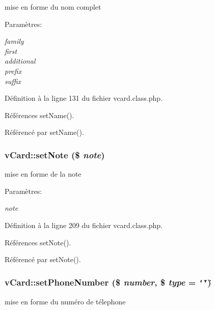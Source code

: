 mise en forme du nom complet 

\begin{Desc}
\item[Param\`{e}tres:]
\begin{description}
\item[{\em family}]\item[{\em first}]\item[{\em additional}]\item[{\em prefix}]\item[{\em suffix}]\end{description}
\end{Desc}


D\'{e}finition \`{a} la ligne 131 du fichier vcard.class.php.

R\'{e}f\'{e}rences set\-Name().

R\'{e}f\'{e}renc\'{e} par set\-Name().\hypertarget{classvCard_a8}{
\subsubsection[setNote]{\setlength{\rightskip}{0pt plus 5cm}v\-Card::set\-Note (\$ {\em note})}}
\label{classvCard_a8}


mise en forme de la note 

\begin{Desc}
\item[Param\`{e}tres:]
\begin{description}
\item[{\em note}]\end{description}
\end{Desc}


D\'{e}finition \`{a} la ligne 209 du fichier vcard.class.php.

R\'{e}f\'{e}rences set\-Note().

R\'{e}f\'{e}renc\'{e} par set\-Note().\hypertarget{classvCard_a0}{
\subsubsection[setPhoneNumber]{\setlength{\rightskip}{0pt plus 5cm}v\-Card::set\-Phone\-Number (\$ {\em number}, \$ {\em type} = {\tt \char`\"{}\char`\"{}})}}
\label{classvCard_a0}


mise en forme du num\'{e}ro de t\'{e}lephone 

